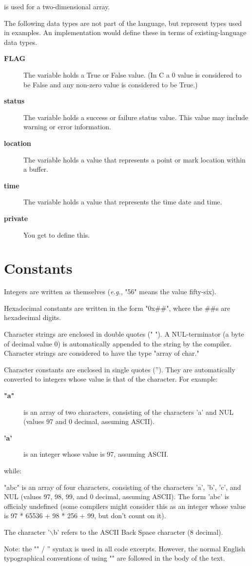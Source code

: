 \par
is used for a two-dimensional array. %
\par
The following data types are not part of the language, but represent %
types used in examples. An implementation would define these in terms %
of existing-language data types. %
\begin{description} %
\item[{\bf FLAG}] The variable holds a True or False value. (In C a %
0 value is considered to be False and any non-zero value is considered %
to be True.) %
\item[{\bf status}] The variable holds a success or failure status %
value. This value may include warning or error information. %
\item[{\bf location}] The variable holds a value that represents a %
point or mark location within a buffer. %
\item[{\bf time}] The variable holds a value that represents the time %
date and time. %
\item[{\bf private}] You get to define this. %
\end{description}
\section{Constants}
\par
Integers are written as themselves ({\it e.g.}, "56" means the value %
fifty-six). %
\par
Hexadecimal constants are written in the form "0x\#\#", where the \#\#s %
are hexadecimal digits. %
\par
Character strings are enclosed in double quotes (" "). A NUL-terminator %
(a byte of decimal value 0) is automatically appended to the string %
by the compiler. Character strings are considered to have the type %
"array of char." %
\par
Character constants are enclosed in single quotes (''). They are automatically %
converted to integers whose value is that of the character. For example: %
\begin{description} %
\item[{\bf "a"}] is an array of two characters, consisting of the characters %
'a' and NUL (values 97 and 0 decimal, assuming ASCII). %
\item[{\bf 'a'}] is an integer whose value is 97, assuming ASCII. %
\end{description}
\par
while: %
\par
"abc" is an array of four characters, consisting of the characters %
'a', 'b', 'c', and NUL (values 97, 98, 99, and 0 decimal, assuming %
ASCII). %
The form 'abc' is officialy undefined (some compilers might consider %
this as an integer whose value is 97 * 65536 + 98 * 256 + 99, but don't %
count on it). %
\par
The character '$\backslash$b' refers to the ASCII Back Space character %
(8 decimal). %
\par
Note: the "" / '' syntax is used in all code excerpts. However, the %
normal English typographical conventions of using "" are followed in %
the body of the text. %
